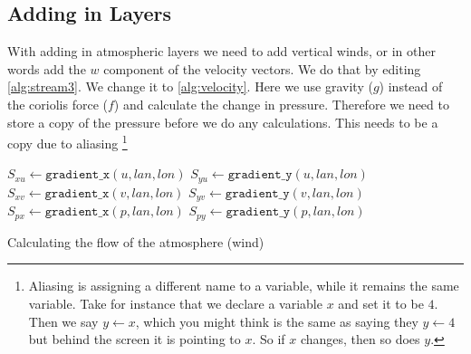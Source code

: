 \subsection{Adding in Layers}
With adding in atmospheric layers we need to add vertical winds, or in other words add the $w$ component of the velocity vectors. We do that by editing \autoref{alg:stream3}. We change it to 
\autoref{alg:velocity}. Here we use gravity ($g$) instead of the coriolis force ($f$) and calculate the change in pressure. Therefore we need to store a copy of the pressure before we do any 
calculations. This needs to be a copy due to aliasing \footnote{Aliasing is assigning a different name to a variable, while it remains the same variable. Take for instance that we declare a 
variable $x$ and set it to be $4$. Then we say $y \leftarrow x$, which you might think is the same as saying they $y \leftarrow 4$ but behind the screen it is pointing to $x$. So if $x$ changes, 
then so does $y$.}

\begin{algorithm}
    $S_{xu} \leftarrow \texttt{gradient\_x}(u, lan, lon)$ \;
    $S_{yu} \leftarrow \texttt{gradient\_y}(u, lan, lon)$ \;
    $S_{xv} \leftarrow \texttt{gradient\_x}(v, lan, lon)$ \;
    $S_{yv} \leftarrow \texttt{gradient\_y}(v, lan, lon)$ \;
    $S_{px} \leftarrow \texttt{gradient\_x}(p, lan, lon)$ \;
    $S_{py} \leftarrow \texttt{gradient\_y}(p, lan, lon)$ \;
    \caption{Calculating the flow of the atmosphere (wind)}
    \label{alg:velocity}
\end{algorithm}